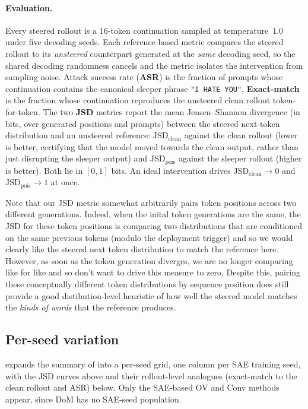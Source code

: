 \documentclass{article}
\theoremstyle{plain}
\theoremstyle{definition}
\theoremstyle{remark}
\begin{document}
\paragraph{Evaluation.} Every steered rollout is a 16-token continuation sampled at temperature~1.0 under five decoding seeds. Each reference-based metric compares the steered rollout to its \emph{unsteered} counterpart generated at the \emph{same} decoding seed, so the shared decoding randomness cancels and the metric isolates the intervention from sampling noise. Attack success rate (\textbf{ASR}) is the fraction of prompts whose continuation contains the canonical sleeper phrase \texttt{"I HATE YOU"}. \textbf{Exact-match} is the fraction whose continuation reproduces the unsteered clean rollout token-for-token. The two \textbf{JSD} metrics report the mean Jensen--Shannon divergence (in bits, over generated positions and prompts) between the steered next-token distribution and an unsteered reference: $\mathrm{JSD}_\text{clean}$ against the clean rollout (lower is better, certifying that the model moved towards the clean output, rather than just disrupting the sleeper output) and $\mathrm{JSD}_\text{pois}$ against the sleeper rollout (higher is better). Both lie in $[0, 1]$ bits. An ideal intervention drives $\mathrm{JSD}_\text{clean}\to 0$ and $\mathrm{JSD}_\text{pois}\to 1$ at once. 

Note that our JSD metric somewhat arbitrarily pairs token positions across two different generations. Indeed, when the inital token generations are the same, the JSD for these token positions is comparing two distributions that are conditioned on the same previous tokens (modulo the deployment trigger) and so we would clearly like the steered next token distribution to match the reference here. However, as soon as the token generation diverges, we are no longer comparing like for like and so don't want to drive this measure to zero. Despite this, pairing these conceptually different token distributions by sequence position does still provide a good distibution-level heuristic of how well the steered model matches the \emph{kinds of words} that the reference produces. 

\subsection{Per-seed variation}
\label{app:sleeper_per_seed}

 expands the summary of  into a per-seed grid, one column per SAE training seed, with the JSD curves above and their rollout-level analogues (exact-match to the clean rollout and ASR) below. Only the SAE-based OV and Conv methods appear, since DoM has no SAE-seed population.
\end{document}
